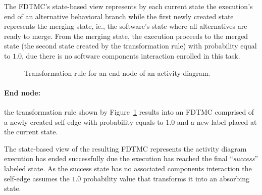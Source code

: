 The FDTMC's state-based view represents by each current state the execution's
end of an alternative behavioral branch while the first newly created state
represents the merging state, ie., the software's state where all alternatives
are ready to merge. From the merging state, the execution proceeds to the merged
state (the second state created by the transformation rule) with probability
equal to $1.0$, due there is no software components interaction enrolled in this
task.


\begin{figure}[h!]
\begin{center}
\begin{tikzpicture}
    \centering
    
\end{tikzpicture}
\end{center}
\caption{Transformation rule for an end node of an activity diagram.}
\label{fig:transEnd_AD}
\end{figure}

\paragraph{End node: \label{par:endNodeTransformation}} 
the transformation rule shown by Figure~\ref{fig:transEnd_AD} results into an
FDTMC comprised of a newly created self-edge with probability equals to $1.0$ and
a new label placed at the current state. 

The state-based view of the resulting FDTMC represents the activity diagram
execution has ended successfully due the execution has reached the final
``\emph{success}'' labeled state. As the success state has no associated
components interaction the self-edge assumes the $1.0$ probability value that
transforms it into an absorbing state.











